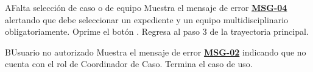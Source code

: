 \begin{UCtrayectoriaA}{A}{Falta selección de caso o de equipo}
	\UCpaso Muestra el mensaje de error \hyperlink{mMSG04}{\bf MSG-04} alertando que debe seleccionar un expediente y un equipo multidisciplinario obligatoriamente.
	\UCpaso[\UCactor] Oprime el botón .
	\UCpaso Regresa al paso 3 de la trayectoria principal.
\end{UCtrayectoriaA}

\begin{UCtrayectoriaA}{B}{Usuario no autorizado}
	\UCpaso Muestra el mensaje de error \hyperlink{mMSG02}{\bf MSG-02} indicando que no cuenta con el rol de Coordinador de Caso.
	\UCpaso Termina el caso de uso.
\end{UCtrayectoriaA}
